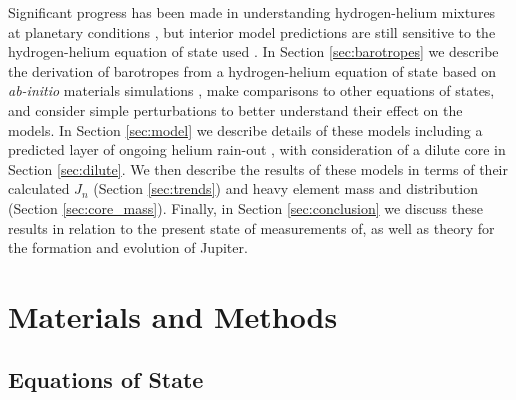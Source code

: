 Significant progress has been made in understanding hydrogen-helium mixtures at
planetary conditions
\citep{saumon1995,Saumon2004,vorberger2007,Militzer2008,Fortney2010,Nettelmann2012,militzer2013a,becker2013,militzer2016},
but interior model predictions are still sensitive to the hydrogen-helium
equation of state used \citep{hubbard2016,miguel2016}. 
In Section \ref{sec:barotropes} we describe the derivation of barotropes from a
hydrogen-helium equation of state based on \textit{ab-initio} materials
simulations \citep{militzer2013a,hubbard2016}, make comparisons to other
equations of states, and consider simple perturbations to better understand
their effect on the models. In Section \ref{sec:model} we describe details of
these models including a predicted layer of ongoing helium rain-out
\citep{stevenson1977a,stevenson1977b,Morales2009,Lorenzen2009,Wilson2010,morales2013},
with consideration of a dilute core in Section \ref{sec:dilute}. We then
describe the results of these models in terms of their calculated $J_n$
(Section \ref{sec:trends}) and heavy element mass and distribution (Section
\ref{sec:core_mass}). Finally, in Section \ref{sec:conclusion} we discuss these
results in relation to the present state of  measurements of, as well as theory
for the formation and evolution of Jupiter.

\section{Materials and Methods} \label{sec:methods}

\subsection{Equations of State}


